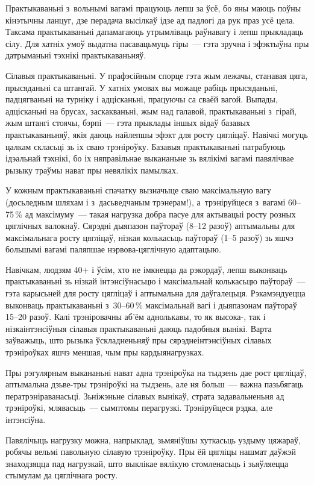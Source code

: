 Практыкаваньні з~вольнымі вагамі працуюць лепш за ўсё, бо яны маюць поўны кінэтычны ланцуг, дзе перадача высілкаў ідзе ад падлогі да рук праз усё цела. Таксама практыкаваньні дапамагаюць утрымліваць раўнавагу і лепш прыкладаць сілу. Для хатніх умоў выдатна пасавацьмуць гіры~--- гэта зручна і эфэктыўна пры датрыманьні тэхнікі практыкаваньняў.

Сілавыя практыкаваньні. У прафэсійным спорце гэта жым лежачы, станавая цяга, прысяданьні са штангай. У хатніх умовах вы можаце рабіць прысяданьні, падцягваньні на турніку і адцісканьні, працуючы са сваёй вагой. Выпады, адцісканьні на брусах, заскакваньні, жым над галавой, практыкаваньні з~гірай, жым штангі стоячы, бэрпі~--- гэта прыклады іншых відаў базавых практыкаваньняў, якія даюць найлепшы эфэкт для росту цягліцаў. Навічкі могуць цалкам скласьці зь іх сваю трэніроўку. Базавыя практыкаваньні патрабуюць ідэальнай тэхнікі, бо іх няправільнае выкананьне зь вялікімі вагамі павялічвае рызыку траўмы нават пры невялікіх памылках.

У кожным практыкаваньні спачатку вызначыце сваю максімальную вагу (досьледным шляхам і з~дасьведчаным трэнерам!), а~трэніруйцеся з~вагамі 60--75\,\% ад максімуму~--- такая нагрузка добра пасуе для актывацыі росту розных цяглічных валокнаў. Сярэдні дыяпазон паўтораў (8--12 разоў) аптымальны для максімальнага росту цягліцаў, нізкая колькасьць паўтораў (1--5 разоў) зь яшчэ большымі вагамі паляпшае нэрвова-цяглічную адаптацыю.

Навічкам, людзям 40+ і ўсім, хто не імкнецца да рэкордаў, лепш выконваць практыкаваньні зь нізкай інтэнсіўнасьцю і максімальнай колькасьцю паўтораў~--- гэта карысьней для росту цягліцаў і аптымальна для даўгалецьця. Рэкамэндуецца выконваць практыкаваньні з~30--60\,\% максімальнай вагі і дыяпазонам паўтораў 15--20 разоў. Калі трэніровачны аб'ём аднолькавы, то як высока-, так і нізкаінтэнсіўныя сілавыя практыкаваньні даюць падобныя вынікі. Варта заўважыць, што рызыка ўскладненьняў пры сярэднеінтэнсіўных сілавых трэніроўках яшчэ меншая, чым пры кардыянагрузках.

Пры рэгулярным выкананьні нават адна трэніроўка на тыдзень дае рост цягліцаў, аптымальна дзьве-тры трэніроўкі на тыдзень, але ня больш~--- важна пазьбягаць ператрэніраванасьці. Зьніжэньне сілавых вынікаў, страта задавальненьня ад трэніроўкі, млявасьць~--- сымптомы перагрузкі. Трэніруйцеся рэдка, але інтэнсіўна.

Павялічыць нагрузку можна, напрыклад, зьмяніўшы хуткасьць уздыму цяжараў, робячы вельмі павольную сілавую трэніроўку. Пры ёй цягліцы нашмат даўжэй знаходзяцца пад нагрузкай, што выклікае вялікую стомленасьць і зьяўляецца стымулам да цяглічнага росту.

